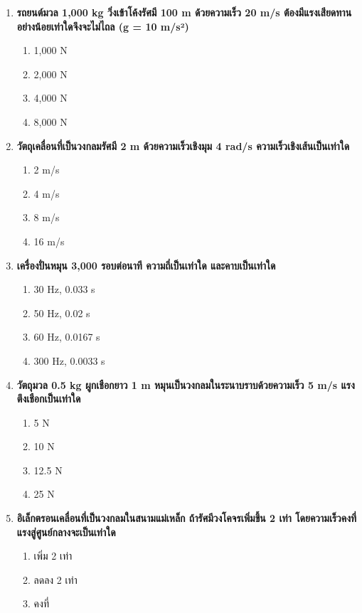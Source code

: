 \documentclass[12pt]{article}
\begin{document}
\begin{enumerate}
\begin{enumerate}[label=\alph*)]
\item 10 N
\item 18 N
\item 28 N
\end{enumerate}
\item \textbf{รถยนต์มวล 1,000 kg วิ่งเข้าโค้งรัศมี 100 m ด้วยความเร็ว 20 m/s ต้องมีแรงเสียดทานอย่างน้อยเท่าใดจึงจะไม่ไถล (g = 10 m/s²)}
\begin{enumerate}[label=\alph*)]
\item 1,000 N
\item 2,000 N
\item 4,000 N
\item 8,000 N
\end{enumerate}
\item \textbf{วัตถุเคลื่อนที่เป็นวงกลมรัศมี 2 m ด้วยความเร็วเชิงมุม 4 rad/s ความเร็วเชิงเส้นเป็นเท่าใด}
\begin{enumerate}[label=\alph*)]
\item 2 m/s
\item 4 m/s
\item 8 m/s
\item 16 m/s
\end{enumerate}
\item \textbf{เครื่องปั่นหมุน 3,000 รอบต่อนาที ความถี่เป็นเท่าใด และคาบเป็นเท่าใด}
\begin{enumerate}[label=\alph*)]
\item 30 Hz, 0.033 s
\item 50 Hz, 0.02 s
\item 60 Hz, 0.0167 s
\item 300 Hz, 0.0033 s
\end{enumerate}
\item \textbf{วัตถุมวล 0.5 kg ผูกเชือกยาว 1 m หมุนเป็นวงกลมในระนาบราบด้วยความเร็ว 5 m/s แรงตึงเชือกเป็นเท่าใด}
\begin{enumerate}[label=\alph*)]
\item 5 N
\item 10 N
\item 12.5 N
\item 25 N
\end{enumerate}
\item \textbf{อิเล็กตรอนเคลื่อนที่เป็นวงกลมในสนามแม่เหล็ก ถ้ารัศมีวงโคจรเพิ่มขึ้น 2 เท่า โดยความเร็วคงที่ แรงสู่ศูนย์กลางจะเป็นเท่าใด}
\begin{enumerate}[label=\alph*)]
\item เพิ่ม 2 เท่า
\item ลดลง 2 เท่า
\item คงที่

\end{enumerate}
\end{enumerate}
\end{document}
